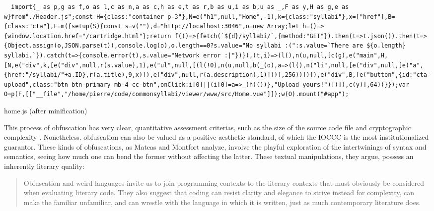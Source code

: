 \begin{listing}
  \begin{verbatim}
  import{_ as p,g as f,o as l,c as n,a as c,h as e,t as r,b as u,i as b,u as _,F as y,H as g,e as w}from"./Header.js";const H={class:"container p-3"},N=e("h1",null,"Home",-1),k={class:"syllabi"},x=["href"],B={class:"cta"},F=m({setup(S){const s=v(""),d="http://localhost:3046",o=new Array;let h=()=>{window.location.href="/cartridge.html"};return f(()=>{fetch(`${d}/syllabi/`,{method:"GET"}).then(t=>t.json()).then(t=>{Object.assign(o,JSON.parse(t)),console.log(o),o.length==0?s.value="No syllabi :(":s.value=`There are ${o.length} syllabi.`}).catch(t=>{console.error(t),s.value="Network error :|"})}),(t,i)=>(l(),n(u,null,[c(g),e("main",H,[N,e("div",k,[e("div",null,r(s.value),1),e("ul",null,[(l(!0),n(u,null,b(_(o),a=>(l(),n("li",null,[e("div",null,[e("a",{href:"/syllabi/"+a.ID},r(a.title),9,x)]),e("div",null,r(a.description),1)]))),256))])]),e("div",B,[e("button",{id:"cta-upload",class:"btn btn-primary mb-4 cc-btn",onClick:i[0]||(i[0]=a=>_(h)())},"Upload yours!")])]),c(y)],64))}});var O=p(F,[["__file","/home/pierre/code/commonsyllabi/viewer/www/src/Home.vue"]]);w(O).mount("#app");
\end{verbatim}
  \caption{home.js (after minification)}
  \label{code:home_minified_js}
\end{listing}

This process of obfuscation has very clear, quantitative assessment criterias, such as the size of the source code file and cryptographic complexity \citep{pellet-mary_co6gc_2020}. Nonetheless. obfuscation can also be valued as a positive aesthetic standard, of which the IOCCC is the most institutionalized guarantor. These kinds of obfuscations, as Mateas and Montfort analyze, involve the playful exploration of the intertwinings of syntax and semantics, seeing how much one can bend the former without affecting the latter. These textual manipulations, they argue, possess an inherently literary quality:

\begin{quote}
  Obfuscation and weird languages invite us to join programming contexts to the literary contexts that must obviously be considered when evaluating literary code. They also suggest that coding can resist clarity and elegance to strive instead for complexity, can make the familiar unfamiliar, and can wrestle with the language in which it is written, just as much contemporary literature does. \citep{mateas_box_2005}
\end{quote}

